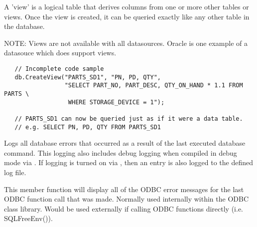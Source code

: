

A 'view' is a logical table that derives columns from one or more other tables or views.  Once the view is created, it can be queried exactly like any other table in the database.

NOTE: Views are not available with all datasources.  Oracle is one example of a datasouce which does support views.

\begin{verbatim}
   // Incomplete code sample
   db.CreateView("PARTS_SD1", "PN, PD, QTY",  
                 "SELECT PART_NO, PART_DESC, QTY_ON_HAND * 1.1 FROM PARTS \
                  WHERE STORAGE_DEVICE = 1");

   // PARTS_SD1 can now be queried just as if it were a data table.
   // e.g. SELECT PN, PD, QTY FROM PARTS_SD1
\end{verbatim}


\label{wxdbdispallerrors}


Logs all database errors that occurred as a result of the last executed database command.  This logging also includes debug logging when compiled in debug mode via .  If logging is turned on via , then an entry is also logged to the defined log file.






This member function will display all of the ODBC error messages for the last ODBC function call that was made.  Normally used internally within the ODBC class library.  Would be used externally if calling ODBC functions directly (i.e. SQLFreeEnv()).

